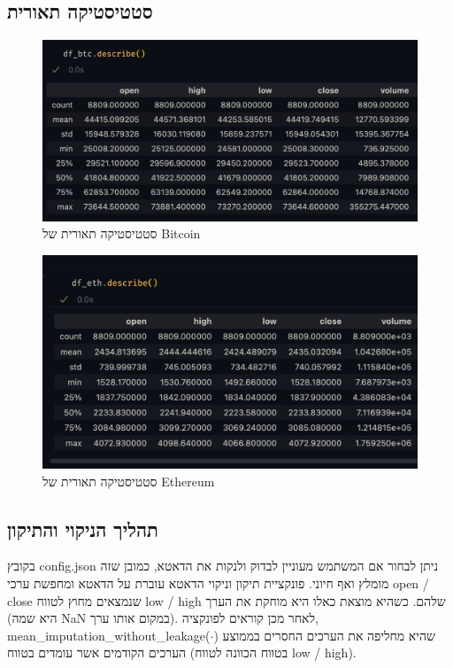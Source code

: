 \documentclass[a4paper,11pt]{article}
\newcommand{\te}[1]{\textenglish{#1}}
\begin{document}
\begin{RTL}
\subsection{סטטיסטיקה תאורית}
\begin{figure}[H]
    \centering
    \includegraphics[width=1\textwidth]{bitcoin_stats.png}
    \caption{סטטיסטיקה תאורית של \te{Bitcoin}}
\end{figure}

\begin{figure}[H]
    \centering
    \includegraphics[width=1\textwidth]{ethereum_stats.png}
\caption{סטטיסטיקה תאורית של \te{Ethereum}}
\end{figure}
\subsection{תהליך הניקוי והתיקון}
בקובץ \te{config.json} ניתן לבחור אם המשתמש מעוניין לבדוק ולנקות את הדאטא, כמובן שזה מומלץ ואף חיוני. פונקציית תיקון וניקוי הדאטא עוברת על הדאטא ומחפשת ערכי \te{open / close} שנמצאים מחוץ לטווח \te{low / high} שלהם. כשהיא מוצאת כאלו היא מוחקת את הערך (היא שמה \te{NaN} במקום אותו ערך). לאחר מכן קוראים לפונקציה,\\ \te{mean\_imputation\_without\_leakage($\cdot$)} שהיא מחליפה את הערכים החסרים בממוצע הערכים הקודמים אשר עומדים בטווח (בטווח הכוונה לטווח \te{low / high}).


\end{RTL}
\end{document}
